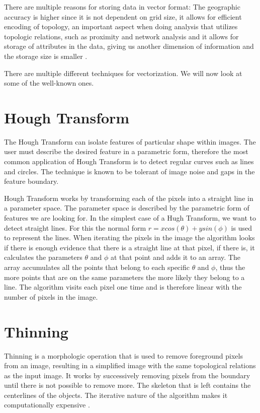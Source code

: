 There are multiple reasons for storing data in vector format: The geographic accuracy is higher since it is not dependent on grid size, it allows for efficient encoding of topology, an important aspect when doing analysis that utilizes topologic relations, such as proximity and network analysis and it allows for storage of attributes in the data, giving us another dimension of information and the storage size is smaller \cite{Dharmaraj2005}.

There are multiple different techniques for vectorization. We will now look at some of the well-known ones.

\section{Hough Transform}
The Hough Transform can isolate features of particular shape within images. The user must describe the desired feature in a parametric form, therefore the most common application of Hough Transform is to detect regular curves such as lines and circles. The technique is known to be tolerant of image noise and gaps in the feature boundary.

Hough Transform works by transforming each of the pixels into a straight line in a parameter space. The parameter space is described by the parametric form of features we are looking for. In the simplest case of a Hugh Transform, we want to detect straight lines. For this the normal form $r = x cos(\theta) + y sin(\phi)$ is used to represent the lines. When iterating the pixels in the image the algorithm looks if there is enough evidence that there is a straight line at that pixel, if there is, it calculates the parameters $\theta$ and $\phi$ at that point and adds it to an array. The array accumulates all the points that belong to each specific $\theta$ and $\phi$, thus the more points that are on the same parameters the more likely they belong to a line. The algorithm visits each pixel one time and is therefore linear with the number of pixels in the image.

\section{Thinning}
Thinning is a morphologic operation that is used to remove foreground pixels from an image, resulting in a simplified image with the same topological relations as the input image. It works by successively removing pixels from the boundary until there is not possible to remove more. The skeleton that is left contains the centerlines of the objects.  The iterative nature of the algorithm makes it computationally expensive \cite{Wenyin1999}.

